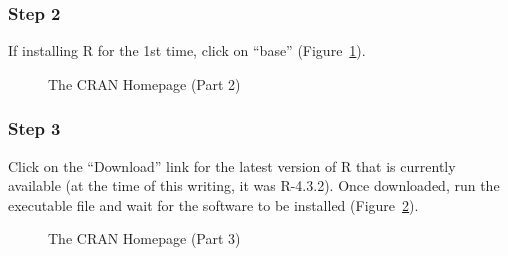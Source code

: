 \documentclass[
  letterpaper,
  DIV=11,
  numbers=noendperiod]{scrreprt}
\begin{document}
\subsubsection{Step 2}\label{step-2}

If installing R for the 1st time, click on ``base''
(Figure~\ref{fig-cran-2}).

\begin{figure}


\caption{\label{fig-cran-2}The CRAN Homepage (Part 2)}

\end{figure}%

\subsubsection{Step 3}\label{step-3}

Click on the ``Download'' link for the latest version of R that is
currently available (at the time of this writing, it was R-4.3.2). Once
downloaded, run the executable file and wait for the software to be
installed (Figure~\ref{fig-cran-3}).

\begin{figure}


\caption{\label{fig-cran-3}The CRAN Homepage (Part 3)}

\end{figure}%
\end{document}
